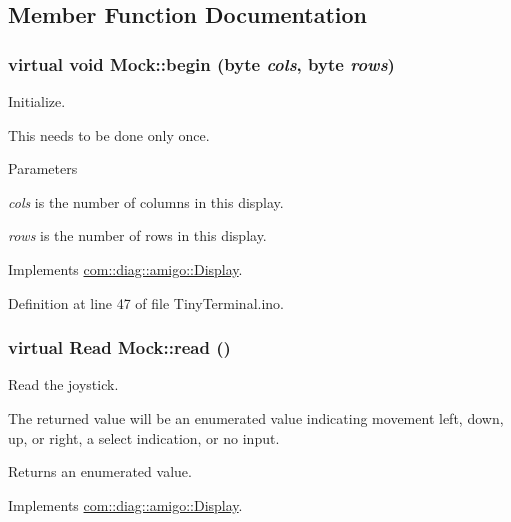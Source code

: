 \subsection{Member Function Documentation}
\hypertarget{classMock_abe7c9964a0b81f8bef519f744b700ea5}{
\subsubsection[{begin}]{\setlength{\rightskip}{0pt plus 5cm}virtual void Mock::begin (byte {\em cols}, \/  byte {\em rows})}}
\label{classMock_abe7c9964a0b81f8bef519f744b700ea5}


Initialize. 

This needs to be done only once. 
\begin{DoxyParams}{Parameters}
\item[{\em cols}]is the number of columns in this display. \item[{\em rows}]is the number of rows in this display. \end{DoxyParams}


Implements \hyperlink{structcom_1_1diag_1_1amigo_1_1Display_aaa68462ae2314243a31fd7532d51c911}{com::diag::amigo::Display}.



Definition at line 47 of file TinyTerminal.ino.

\hypertarget{classMock_a0fb6d589bee9e919766e1bb17076351c}{
\subsubsection[{read}]{\setlength{\rightskip}{0pt plus 5cm}virtual {\bf Read} Mock::read ()}}
\label{classMock_a0fb6d589bee9e919766e1bb17076351c}


Read the joystick. 

The returned value will be an enumerated value indicating movement left, down, up, or right, a select indication, or no input. \begin{DoxyReturn}{Returns}
an enumerated value. 
\end{DoxyReturn}


Implements \hyperlink{structcom_1_1diag_1_1amigo_1_1Display_ac630c8e1bbb3ce3091e6db01e1c383e7}{com::diag::amigo::Display}.



